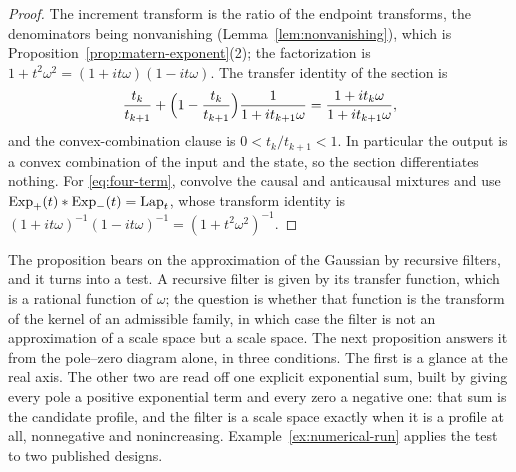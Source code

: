 \begin{proof}
The increment transform is the ratio of the endpoint transforms, the denominators being
nonvanishing (Lemma~\ref{lem:nonvanishing}), which is
Proposition~\ref{prop:matern-exponent}(2); the factorization is
$1 + t^2\omega^2 = (1+it\omega)(1-it\omega)$. The transfer identity of the section is
\[
  \frac{t_k}{t_{k+1}} + \Bigl(1 - \frac{t_k}{t_{k+1}}\Bigr)\frac{1}{1+it_{k+1}\omega}
  = \frac{1 + it_k\omega}{1 + it_{k+1}\omega},
\]
and the convex-combination clause is $0 < t_k/t_{k+1} < 1$. In particular the output is a convex
combination of the input and the state, so the section differentiates nothing. For
\ref{eq:four-term}, convolve the
causal and anticausal mixtures and use $\operatorname{Exp}_+(t) * \operatorname{Exp}_-(t) = \operatorname{Lap}_t$, whose transform identity
is $(1+it\omega)^{-1}(1-it\omega)^{-1} = (1+t^2\omega^2)^{-1}$.
\end{proof}

The proposition bears on the approximation of the Gaussian by recursive filters, and it turns
into a test. A recursive filter is given by its transfer function, which is a rational function
of $\omega$; the question is whether that function is the transform of the kernel of an
admissible family, in which case the filter is not an approximation of a scale space but a scale
space. The next proposition answers it from the pole--zero diagram alone, in three conditions.
The first is a glance at the real axis. The other two are read off one explicit exponential sum,
built by giving every pole a positive exponential term and every zero a negative one: that sum is
the candidate profile, and the filter is a scale space exactly when it is a profile at all,
nonnegative and nonincreasing. Example~\ref{ex:numerical-run} applies the test to two published
designs.

